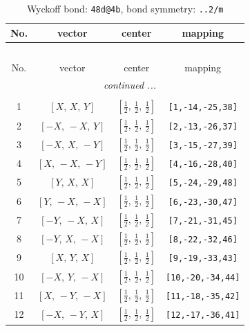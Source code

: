 \documentclass[fleqn,8pt]{jsarticle}
\begin{document}
\begin{longtable}{cccc}
\caption{Wyckoff bond: {\tt 48d@4b}, bond symmetry: {\tt ..2/m}}
 \\
 \hline \hline
No. & vector & center & mapping \\ \hline \endfirsthead

\multicolumn{3}{l}{\tablename\ \thetable{}} \\
 \hline \hline
No. & vector & center & mapping \\ \hline \endhead

 \hline \hline
\multicolumn{3}{r}{\footnotesize\it continued ...} \\ \endfoot

 \hline \hline
\multicolumn{3}{r}{} \\ \endlastfoot

1 & $\left[ X,\, X,\, Y \right]$ & $\left[ \frac{1}{2},\, \frac{1}{2},\, \frac{1}{2} \right]$ & {\tt [1,-14,-25,38]} \\ \hline
2 & $\left[ - X,\, - X,\, Y \right]$ & $\left[ \frac{1}{2},\, \frac{1}{2},\, \frac{1}{2} \right]$ & {\tt [2,-13,-26,37]} \\ \hline
3 & $\left[ - X,\, X,\, - Y \right]$ & $\left[ \frac{1}{2},\, \frac{1}{2},\, \frac{1}{2} \right]$ & {\tt [3,-15,-27,39]} \\ \hline
4 & $\left[ X,\, - X,\, - Y \right]$ & $\left[ \frac{1}{2},\, \frac{1}{2},\, \frac{1}{2} \right]$ & {\tt [4,-16,-28,40]} \\ \hline
5 & $\left[ Y,\, X,\, X \right]$ & $\left[ \frac{1}{2},\, \frac{1}{2},\, \frac{1}{2} \right]$ & {\tt [5,-24,-29,48]} \\ \hline
6 & $\left[ Y,\, - X,\, - X \right]$ & $\left[ \frac{1}{2},\, \frac{1}{2},\, \frac{1}{2} \right]$ & {\tt [6,-23,-30,47]} \\ \hline
7 & $\left[ - Y,\, - X,\, X \right]$ & $\left[ \frac{1}{2},\, \frac{1}{2},\, \frac{1}{2} \right]$ & {\tt [7,-21,-31,45]} \\ \hline
8 & $\left[ - Y,\, X,\, - X \right]$ & $\left[ \frac{1}{2},\, \frac{1}{2},\, \frac{1}{2} \right]$ & {\tt [8,-22,-32,46]} \\ \hline
9 & $\left[ X,\, Y,\, X \right]$ & $\left[ \frac{1}{2},\, \frac{1}{2},\, \frac{1}{2} \right]$ & {\tt [9,-19,-33,43]} \\ \hline
10 & $\left[ - X,\, Y,\, - X \right]$ & $\left[ \frac{1}{2},\, \frac{1}{2},\, \frac{1}{2} \right]$ & {\tt [10,-20,-34,44]} \\ \hline
11 & $\left[ X,\, - Y,\, - X \right]$ & $\left[ \frac{1}{2},\, \frac{1}{2},\, \frac{1}{2} \right]$ & {\tt [11,-18,-35,42]} \\ \hline
12 & $\left[ - X,\, - Y,\, X \right]$ & $\left[ \frac{1}{2},\, \frac{1}{2},\, \frac{1}{2} \right]$ & {\tt [12,-17,-36,41]} \\
\end{longtable}
\end{document}
